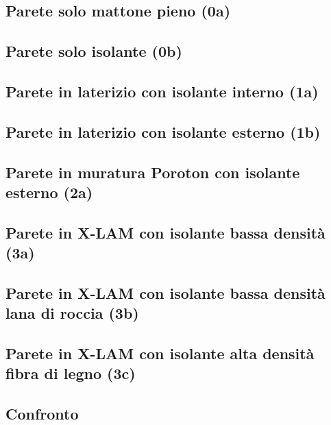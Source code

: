 \documentclass[a4paper,10pt]{report}
\begin{document}
\begin{landscape}
        \clearpage
        \subsection*{Parete solo mattone pieno (0a)}
        
        \clearpage
        \subsection*{Parete solo isolante (0b)}
        
        \clearpage
        \subsection*{Parete in laterizio con isolante interno (1a)}
        
        \clearpage
        \subsection*{Parete in laterizio con isolante esterno (1b)}
        
        \clearpage
        \subsection*{Parete in muratura Poroton con isolante esterno (2a)}
        
        \clearpage
        \subsection*{Parete in X-LAM con isolante bassa densità (3a)}
        
        \clearpage
        \subsection*{Parete in X-LAM con isolante bassa densità lana di roccia (3b)}
        
        \clearpage
        \subsection*{Parete in X-LAM con isolante alta densità fibra di legno (3c)}
        
        \subsection*{Confronto}
        
        \clearpage
        
\end{landscape}
\end{document}
